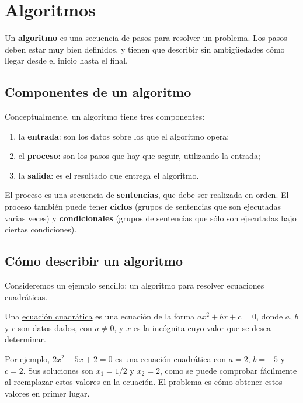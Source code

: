 \chapter{Algoritmos}

Un \textbf{algoritmo} es una secuencia de pasos para resolver un
problema.
Los pasos deben estar muy bien definidos, y tienen que describir sin
ambigüedades cómo llegar desde el inicio hasta el final.

\section{Componentes de un algoritmo}

Conceptualmente, un algoritmo tiene tres componentes:

\begin{enumerate}
\item
  la \textbf{entrada}: son los datos sobre los que el algoritmo opera;
\item
  el \textbf{proceso}: son los pasos que hay que seguir, utilizando la
  entrada;
\item
  la \textbf{salida}: es el resultado que entrega el algoritmo.
\end{enumerate}

El proceso es una secuencia de \textbf{sentencias}, que debe ser
realizada en orden. El proceso también puede tener \textbf{ciclos}
(grupos de sentencias que son ejecutadas varias veces) y
\textbf{condicionales} (grupos de sentencias que sólo son ejecutadas
bajo ciertas condiciones).

\section{Cómo describir un algoritmo}

Consideremos un ejemplo sencillo: un algoritmo para resolver ecuaciones
cuadráticas.

Una
\href{http://es.wikipedia.org/wiki/Ecuaci\%C3\%B3n\_de\_segundo\_grado}{ecuación
cuadrática} es una ecuación de la forma \(ax^2 + bx + c = 0\), donde
\(a\), \(b\) y \(c\) son datos dados, con \(a\ne 0\), y \(x\) es la incógnita cuyo
valor que se desea determinar.

Por ejemplo, \(2x^2 - 5x + 2 = 0\) es una ecuación cuadrática con \(a =
2\), \(b = -5\) y \(c = 2\). Sus soluciones son \(x_1 = 1/2\) y \(x_2 = 2\),
como se puede comprobar fácilmente al reemplazar estos valores en la
ecuación. El problema es cómo obtener estos valores en primer lugar.

